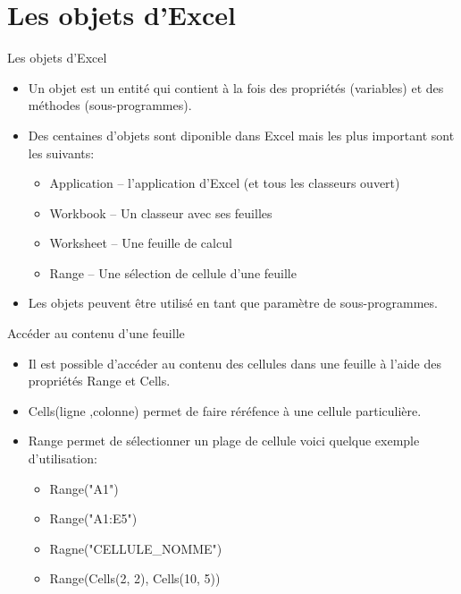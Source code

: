 \documentclass[aspectratio=169,usenames,dvipsnames]{beamer}
\begin{document}
    \section{Les objets d'Excel}
    \begin{frame}{Les objets d'Excel}
        \begin{itemize}
            \item Un objet est un entité qui contient à la fois des propriétés (variables) et des méthodes (sous-programmes).
            \item Des centaines d’objets sont diponible dans Excel mais les plus important sont les suivants:
            \begin{itemize}
                \item Application – l’application d’Excel (et tous les classeurs ouvert)
                \item Workbook – Un classeur avec ses feuilles
                \item Worksheet – Une feuille de calcul
                \item Range – Une sélection de cellule d’une feuille
            \end{itemize}
            \item Les objets peuvent être utilisé en tant que paramètre de sous-programmes.
        \end{itemize}
    \end{frame}
    \begin{frame}{Accéder au contenu d’une feuille}
        \begin{itemize}
            \item Il est possible d'accéder au contenu des cellules dans une feuille à l'aide des propriétés Range et Cells.
            \item Cells(ligne ,colonne) permet de faire réréfence à une cellule particulière.
            \item Range permet de sélectionner un plage de cellule voici quelque exemple d’utilisation:
            \begin{itemize}
            \item Range("A1")
            \item Range("A1:E5")
            \item Ragne("CELLULE\_NOMME")
            \item Range(Cells(2, 2), Cells(10, 5))
            \end{itemize}
        \end{itemize}

    \end{frame}
\end{document}
